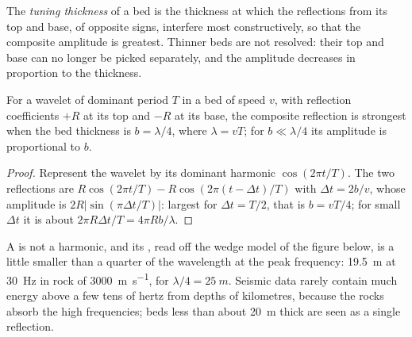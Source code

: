 \begin{definition}\label{def:b3:exploration-seismology:resolution}
The \emph{tuning thickness} of a bed is the thickness
at which the reflections from its top and base, of opposite signs, interfere
most constructively, so that the composite amplitude is greatest. Thinner beds
are not resolved: their top and base can no longer be picked separately, and
the amplitude decreases in proportion to the thickness.
\end{definition}

\begin{proposition}\label{prop:b3:exploration-seismology:tuning}
For a wavelet of dominant period $T$ in a bed of speed $v$, with reflection
coefficients $+R$ at its top and $-R$ at its base, the composite reflection is
strongest when the bed thickness is $b = \lambda/4$, where $\lambda = vT$; for
$b \ll \lambda/4$ its amplitude is proportional to $b$.
\end{proposition}

\begin{proof}
Represent the wavelet by its dominant harmonic $\cos(2\pi t/T)$. The two
reflections are $R\cos(2\pi t/T) - R\cos(2\pi(t - \Delta t)/T)$ with
$\Delta t = 2b/v$, whose amplitude is $2R|\sin(\pi\Delta t/T)|$: largest for
$\Delta t = T/2$, that is $b = vT/4$; for small $\Delta t$ it is about
$2\pi R\Delta t/T = 4\pi Rb/\lambda$.
\end{proof}

A  is not a harmonic, and its , read off the wedge
model of the figure below, is a little smaller than a quarter of the wavelength
at the peak frequency: \qty{19.5}{m} at \qty{30}{Hz} in rock of
\qty{3000}{m.s^{-1}}, for $\lambda/4 = \qty{25}{m}$. Seismic data rarely contain
much energy above a few tens of hertz from depths of kilometres, because the
rocks absorb the high frequencies; beds less than about \qty{20}{m} thick are
seen as a single reflection.

